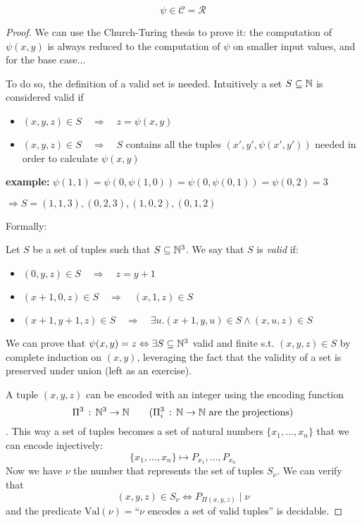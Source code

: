 \begin{theorem}
  \[\psi \in \mathcal{C} = \mathcal{R}\]
  \begin{proof}
    We can use the Church-Turing thesis to prove it: the computation
    of $\psi(x,y)$ is always reduced to the computation of $\psi$ on
    smaller input values, and for the base case...

    To do so, the definition of a valid set is needed. Intuitively a
    set $S \subseteq \mathbb{N}$ is considered valid if

    \begin{itemize}
    \item \((x,y,z) \in S \quad \Rightarrow \quad z = \psi(x,y)\)
    \item \((x,y,z) \in S \quad \Rightarrow \quad S\) contains all the
      tuples \((x', y', \psi(x',y'))\) needed in order to calculate
      $\psi(x,y)$
    \end{itemize}

    \textbf{example:}
    $\psi(1,1) = \psi(0,\psi(1,0)) = \psi(0,\psi(0,1)) = \psi(0,2) = 3$

    $\Rightarrow S = {(1,1,3), (0,2,3), (1,0,2), (0,1,2)}$

    Formally:

    \begin{definition}
      Let $S$ be a set of tuples such that $S \subseteq \mathbb{N}^3$. We say
      that $S$ is \emph{valid} if:
      \begin{itemize}
      \item \((0,y,z) \in S \quad \Rightarrow \quad z = y+1\)
      \item \((x+1,0,z) \in S \quad \Rightarrow \quad (x,1,z) \in S\)
      \item
        \((x+1,y+1,z) \in S \quad \Rightarrow \quad \exists u . (x+1,
        y, u) \in S \wedge (x,u,z) \in S \)
      \end{itemize}
    \end{definition}

    We can prove that
    \(\psi(x,y) = z \Leftrightarrow \exists S \subseteq \mathbb{N}^3\) valid
    and finite s.t. \((x,y,z) \in S\) by complete induction on
    $(x,y)$, leveraging the fact that the validity of a set is
    preserved under union (left as an exercise).

    \newcommand{\vnu}{\text{Val}(\nu)}

    A tuple $(x,y,z)$ can be encoded with an integer using the
    encoding function
    \[\Pi^3 \, : \, \mathbb{N}^3 \rightarrow \mathbb{N} \quad \quad (\Pi_i^3 \, : \,
      \mathbb{N} \rightarrow \mathbb{N} \text{ are the projections})\]. This way a
    set of tuples becomes a set of natural numbers
    $\{x_1, \dots, x_n\}$ that we can encode injectively:
    \[\{x_1, \dots, x_n\} \mapsto P_{x_1}, \dots, P_{x_n}\] Now we
    have $\nu$ the number that represents the set of tuples
    $S_\nu$. We can verify that
    \[(x,y,z) \in S_\nu \Longleftrightarrow P_{\Pi(x,y,z)} \; | \;
      \nu \] and the predicate $\vnu=$``$\nu$ encodes a
    set of valid tuples'' is decidable.


\end{proof}
\end{theorem}
